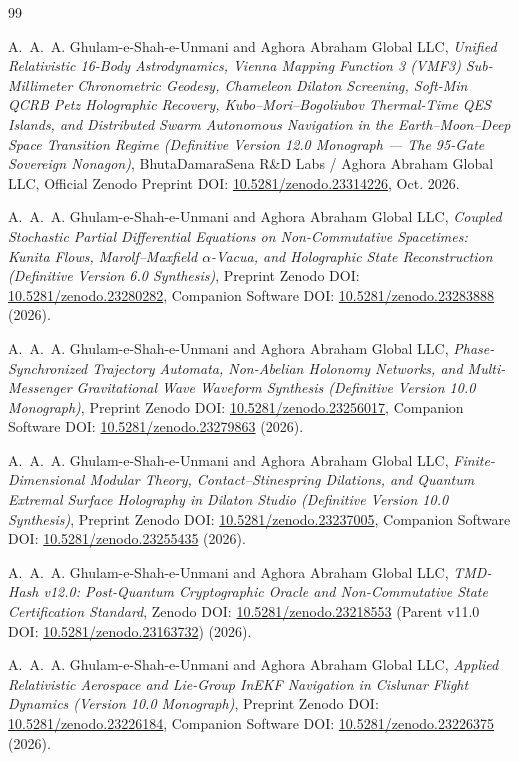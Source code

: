 \documentclass[11pt,a4paper,reqno]{article}
\def\texttt#1{#1}%
\newcommand{\zenodo}[1]{\href{https://doi.org/10.5281/zenodo.#1}{\texttt{10.5281/\allowbreak zenodo.#1}}}
\theoremstyle{plain}
\theoremstyle{definition}
\theoremstyle{remark}
\numberwithin{equation}{section}
\begin{document}
\begin{thebibliography}{99}

A.~A.~A. Ghulam-e-Shah-e-Unmani and {Aghora Abraham Global LLC},
\emph{Unified Relativistic 16-Body Astrodynamics, Vienna Mapping Function 3 (VMF3) Sub-Millimeter Chronometric Geodesy, Chameleon Dilaton Screening, Soft-Min QCRB Petz Holographic Recovery, Kubo--Mori--Bogoliubov Thermal-Time QES Islands, and Distributed Swarm Autonomous Navigation in the Earth--Moon--Deep Space Transition Regime (Definitive Version 12.0 Monograph --- The 95-Gate Sovereign Nonagon)},
BhutaDamaraSena R\&D Labs / Aghora Abraham Global LLC, Official Zenodo Preprint DOI: \zenodo{23314226}, Oct. 2026.

A.~A.~A. Ghulam-e-Shah-e-Unmani and {Aghora Abraham Global LLC},
\emph{Coupled Stochastic Partial Differential Equations on Non-Commutative Spacetimes: Kunita Flows, Marolf--Maxfield $\alpha$-Vacua, and Holographic State Reconstruction (Definitive Version 6.0 Synthesis)},
Preprint Zenodo DOI: \zenodo{23280282},
Companion Software DOI: \zenodo{23283888} (2026).

A.~A.~A. Ghulam-e-Shah-e-Unmani and {Aghora Abraham Global LLC},
\emph{Phase-Synchronized Trajectory Automata, Non-Abelian Holonomy Networks, and Multi-Messenger Gravitational Wave Waveform Synthesis (Definitive Version 10.0 Monograph)},
Preprint Zenodo DOI: \zenodo{23256017},
Companion Software DOI: \zenodo{23279863} (2026).

A.~A.~A. Ghulam-e-Shah-e-Unmani and {Aghora Abraham Global LLC},
\emph{Finite-Dimensional Modular Theory, Contact--Stinespring Dilations, and Quantum Extremal Surface Holography in Dilaton Studio (Definitive Version 10.0 Synthesis)},
Preprint Zenodo DOI: \zenodo{23237005},
Companion Software DOI: \zenodo{23255435} (2026).

A.~A.~A. Ghulam-e-Shah-e-Unmani and {Aghora Abraham Global LLC},
\emph{TMD-Hash v12.0: Post-Quantum Cryptographic Oracle and Non-Commutative State Certification Standard},
Zenodo DOI: \zenodo{23218553} (Parent v11.0 DOI: \zenodo{23163732}) (2026).

A.~A.~A. Ghulam-e-Shah-e-Unmani and {Aghora Abraham Global LLC},
\emph{Applied Relativistic Aerospace and Lie-Group InEKF Navigation in Cislunar Flight Dynamics (Version 10.0 Monograph)},
Preprint Zenodo DOI: \zenodo{23226184},
Companion Software DOI: \zenodo{23226375} (2026).


\end{thebibliography}
\end{document}
